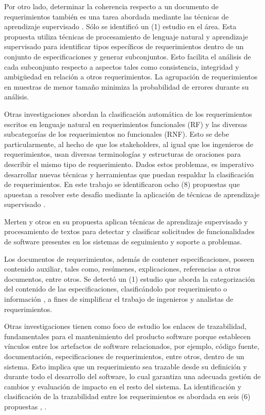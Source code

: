 \documentclass[journal]{IEEEtran}
\begin{document}
Por otro lado, determinar la coherencia respecto a un documento de requerimientos también es una tarea abordada mediante las técnicas de aprendizaje supervisado \cite{nikora2009automated}. Sólo se identificó un (1) estudio en el área. Esta propuesta utiliza técnicas de procesamiento de lenguaje natural y aprendizaje supervisado para identificar tipos específicos de requerimientos dentro de un conjunto de especificaciones y generar subconjuntos. Esto facilita el análisis de cada subconjunto respecto a aspectos tales como consistencia, integridad y ambigüedad en relación a otros requerimientos. La agrupación de requerimientos en muestras de menor tamaño minimiza la probabilidad de errores durante su análisis.

Otras investigaciones abordan la clasificación automática de los requerimientos escritos en lenguaje natural en requerimientos funcionales (RF) y las diversas subcategorías de los requerimientos no funcionales (RNF). Esto se debe particularmente, al hecho de que los stakeholders, al igual que los ingenieros de requerimientos, usan diversas terminologías y estructuras de oraciones para describir el mismo tipo de requerimiento. Dados estos problemas, es imperativo desarrollar nuevas técnicas y herramientas que puedan respaldar la clasificación de requerimientos. En este trabajo se identificaron ocho (8) propuestas que apuestan a resolver este desafío mediante la aplicación de técnicas de aprendizaje supervisado \cite{li2017identifying,Jindal20162027,kurtanovic2017automatically,dekhtyar2017re,abad2017works,Slankas2013,Slankas2013a}.

Merten y otros \cite{Merten2016} en su propuesta aplican técnicas de aprendizaje supervisado y procesamiento de textos para detectar y clasificar solicitudes de funcionalidades de software presentes en los sistemas de seguimiento y soporte a problemas.

Los documentos de requerimientos, además de contener especificaciones, poseen contenido auxiliar, tales como, resúmenes, explicaciones, referencias a otros documentos, entre otros. Se detectó un (1) estudio que aborda la categorización del contenido de las especificaciones, clasificándolo por requerimiento o información \cite{winkler2016automatic}, a fines de simplificar el trabajo de ingenieros y analistas de requerimientos.

Otras investigaciones tienen como foco de estudio los enlaces de trazabilidad, fundamentales para el mantenimiento del producto software porque establecen vínculos entre los artefactos de software relacionados, por ejemplo, código fuente, documentación, especificaciones de requerimientos, entre otros, dentro de un sistema. Esto implica que un requerimiento sea trazable desde su definición y durante todo el desarrollo del software, lo cual garantiza una adecuada gestión de cambios y evaluación de impacto en el resto del sistema. La identificación y clasificación de la trazabilidad entre los requerimientos es abordada en seis (6) propuestas \cite{Li201725}, \cite{Cleland-Huang2010,gokyer2008non,Mills2017,Sardinha2013,AtasM.2018}.
\end{document}
